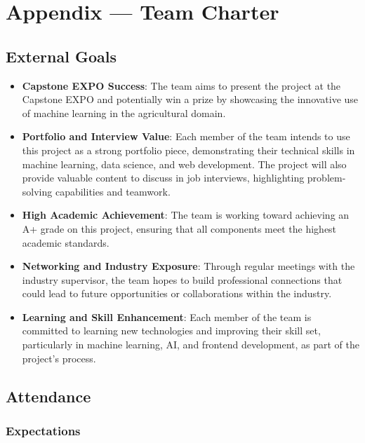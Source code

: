 \documentclass{article}
\begin{document}
\newpage{}

\section*{Appendix --- Team Charter}

\subsection*{External Goals}

\begin{itemize}
    \item \textbf{Capstone EXPO Success}: The team aims to present the project at the Capstone EXPO and potentially win a prize by showcasing the innovative use of machine learning in the agricultural domain.
    
    \item \textbf{Portfolio and Interview Value}: Each member of the team intends to use this project as a strong portfolio piece, demonstrating their technical skills in machine learning, data science, and web development. The project will also provide valuable content to discuss in job interviews, highlighting problem-solving capabilities and teamwork.
    
    \item \textbf{High Academic Achievement}: The team is working toward achieving an A+ grade on this project, ensuring that all components meet the highest academic standards.
    
    \item \textbf{Networking and Industry Exposure}: Through regular meetings with the industry supervisor, the team hopes to build professional connections that could lead to future opportunities or collaborations within the industry.
    
    \item \textbf{Learning and Skill Enhancement}: Each member of the team is committed to learning new technologies and improving their skill set, particularly in machine learning, AI, and frontend development, as part of the project's process.
\end{itemize}


\subsection*{Attendance}

\subsubsection*{Expectations}
\end{document}
